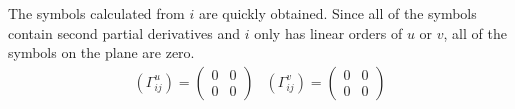 \documentclass{article}
\begin{document}
		The symbols calculated from $i$ are quickly obtained.
		Since all of the symbols contain second partial derivatives and $i$ only has linear orders of $u$ or $v$, all of the symbols on the plane are zero.
		\begin{equation}
			\begin{array}{lr}
				\left(\Gamma^{u}_{ij}\right) = \left( \begin{array}{cc}
					0 & 0 \\
					0 & 0
				\end{array} \right) &
				\left(\Gamma^{v}_{ij}\right) = \left( \begin{array}{cc}
					0 & 0 \\
					0 & 0
				\end{array} \right)
			\end{array}
		\end{equation}
		
\end{document}
